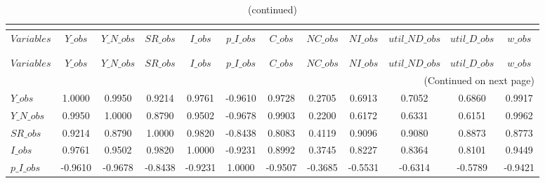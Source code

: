  
\begin{center}
\begin{longtable}{lccccccccccc} 
\caption{MATRIX OF CORRELATIONS}\\
 \label{Table:th_corr_matrix}\\
\toprule 
$Variables      $	 & 	 $          Y\_obs$	 & 	 $      Y\_N\_obs$	 & 	 $         SR\_obs$	 & 	 $          I\_obs$	 & 	 $      p\_I\_obs$	 & 	 $          C\_obs$	 & 	 $         NC\_obs$	 & 	 $         NI\_obs$	 & 	 $  util\_ND\_obs$	 & 	 $   util\_D\_obs$	 & 	 $          w\_obs$\\
\midrule \endfirsthead 
\caption{(continued)}\\
 \toprule \\ 
$Variables      $	 & 	 $          Y\_obs$	 & 	 $      Y\_N\_obs$	 & 	 $         SR\_obs$	 & 	 $          I\_obs$	 & 	 $      p\_I\_obs$	 & 	 $          C\_obs$	 & 	 $         NC\_obs$	 & 	 $         NI\_obs$	 & 	 $  util\_ND\_obs$	 & 	 $   util\_D\_obs$	 & 	 $          w\_obs$\\
\midrule \endhead 
\midrule \multicolumn{12}{r}{(Continued on next page)} \\ \bottomrule \endfoot 
\bottomrule \endlastfoot 
$Y\_obs         $	 & 	           1.0000	 & 	           0.9950	 & 	           0.9214	 & 	           0.9761	 & 	          -0.9610	 & 	           0.9728	 & 	           0.2705	 & 	           0.6913	 & 	           0.7052	 & 	           0.6860	 & 	           0.9917 \\ 
$Y\_N\_obs      $	 & 	           0.9950	 & 	           1.0000	 & 	           0.8790	 & 	           0.9502	 & 	          -0.9678	 & 	           0.9903	 & 	           0.2200	 & 	           0.6172	 & 	           0.6331	 & 	           0.6151	 & 	           0.9962 \\ 
$SR\_obs        $	 & 	           0.9214	 & 	           0.8790	 & 	           1.0000	 & 	           0.9820	 & 	          -0.8438	 & 	           0.8083	 & 	           0.4119	 & 	           0.9096	 & 	           0.9080	 & 	           0.8873	 & 	           0.8773 \\ 
$I\_obs         $	 & 	           0.9761	 & 	           0.9502	 & 	           0.9820	 & 	           1.0000	 & 	          -0.9231	 & 	           0.8992	 & 	           0.3745	 & 	           0.8227	 & 	           0.8364	 & 	           0.8101	 & 	           0.9449 \\ 
$p\_I\_obs      $	 & 	          -0.9610	 & 	          -0.9678	 & 	          -0.8438	 & 	          -0.9231	 & 	           1.0000	 & 	          -0.9507	 & 	          -0.3685	 & 	          -0.5531	 & 	          -0.6314	 & 	          -0.5789	 & 	          -0.9421 \\ 

\end{longtable}
\end{center}
